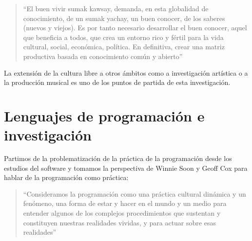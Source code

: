 \begin{quote}

  ``El buen vivir sumak kawsay, demanda, en esta globalidad de conocimiento, de un sumak yachay, un buen conocer, de los saberes (nuevos y viejos). Es por tanto necesario desarrollar el buen conocer, aquel que beneficia a todos, que crea un entorno rico y fértil para la vida cultural, social, económica, política. En definitiva, crear una matriz productiva basada en conocimiento común y abierto''\citep[p.~31]{platohedro}

\end{quote}


La extensión de la cultura libre a otros ámbitos como a investigación artística o a la producción musical es uno de los puntos de partida de esta investigación. 

\section{Lenguajes de programación e investigación} %

Partimos de la problematización de la práctica de la programación desde los estudios del software y tomamos la perspectiva de Winnie Soon y Geoff Cox para hablar de la programación como práctica:

\begin{quote}

``Consideramos la programación como una práctica cultural dinámica y un fenómeno, una forma de estar y hacer en el mundo y un medio para entender algunos de los complejos procedimientos que sustentan y constituyen nuestras realidades vividas, y para actuar sobre esas realidades'' \citep[p.~14]{aestheticProgramming}
  
\end{quote}


